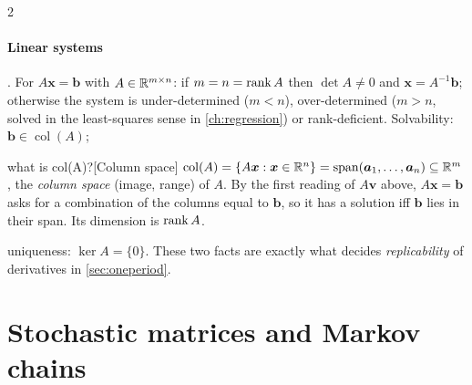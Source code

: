 \begin{paracol}{2}
\paragraph{Linear systems} . For $A\bm x=\bm b$ with $A\in\mathbb{R}^{m\times n}$: if
$m=n=\operatorname{rank} A$ then $\det A\ne0$ and $\bm x=A^{-1}\bm b$; otherwise the system is under-determined
($m<n$), over-determined ($m>n$, solved in the least-squares sense in \cref{ch:regression}) or
rank-deficient. Solvability: $\bm b\in\operatorname{col}(A)$; \begin{answer}{what is col(A)?}[Column space]
$\operatorname{col}(A)=\{A\bm x:\bm x\in\mathbb{R}^n\}=\operatorname{span}(\bm a_1,\dots,\bm a_n)\subseteq\mathbb{R}^m$, the
\emph{column space} (image, range) of $A$. By the first reading of $A\bm v$ above, $A\bm x=\bm b$ asks
for a combination of the columns equal to $\bm b$, so it has a solution iff $\bm b$ lies in their span.
Its dimension is $\operatorname{rank} A$.
\end{answer} uniqueness: $\ker A=\{0\}$. These two
facts are exactly what decides \emph{replicability} of derivatives in \cref{sec:oneperiod}.

\section{Stochastic matrices and Markov chains}\label{sec:markov}


\end{paracol}
